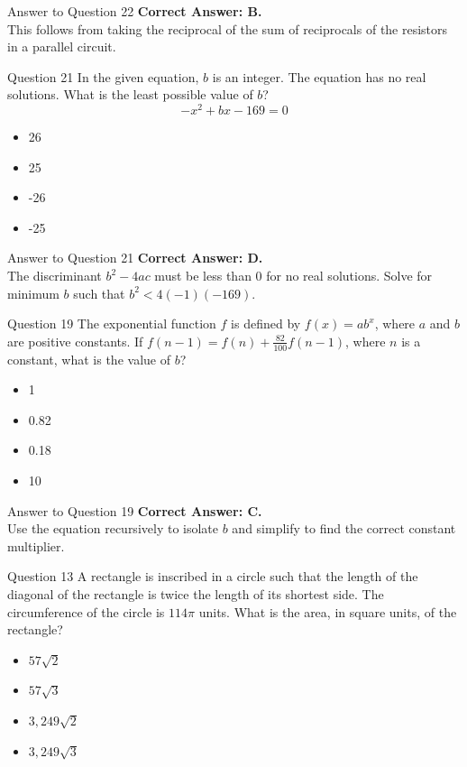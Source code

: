 \documentclass{beamer}
\begin{document}
\begin{frame}{Answer to Question 22}
\textbf{Correct Answer: B.} \\
This follows from taking the reciprocal of the sum of reciprocals of the resistors in a parallel circuit.
\end{frame}

\begin{frame}{Question 21}
In the given equation, $b$ is an integer. The equation has no real solutions.  
What is the least possible value of $b$?
\[
-x^2 + bx - 169 = 0
\]
\begin{itemize}
    \item[A.] 26
    \item[B.] 25
    \item[C.] -26
    \item[D.] -25
\end{itemize}
\end{frame}

\begin{frame}{Answer to Question 21}
\textbf{Correct Answer: D.} \\
The discriminant $b^2 - 4ac$ must be less than 0 for no real solutions. Solve for minimum $b$ such that $b^2 < 4(-1)(-169)$.
\end{frame}

\begin{frame}{Question 19}
The exponential function $f$ is defined by $f(x) = ab^x$, where $a$ and $b$ are positive constants.  
If $f(n - 1) = f(n) + \frac{82}{100}f(n - 1)$, where $n$ is a constant, what is the value of $b$?
\begin{itemize}
    \item[A.] 1
    \item[B.] 0.82
    \item[C.] 0.18
    \item[D.] 10
\end{itemize}
\end{frame}

\begin{frame}{Answer to Question 19}
\textbf{Correct Answer: C.} \\
Use the equation recursively to isolate $b$ and simplify to find the correct constant multiplier.
\end{frame}

\begin{frame}{Question 13}
A rectangle is inscribed in a circle such that the length of the diagonal of the rectangle is twice the length of its shortest side.  
The circumference of the circle is $114\pi$ units.  
What is the area, in square units, of the rectangle?
\begin{itemize}
    \item[A.] $57\sqrt{2}$
    \item[B.] $57\sqrt{3}$
    \item[C.] $3,\!249\sqrt{2}$
    \item[D.] $3,\!249\sqrt{3}$
\end{itemize}
\end{frame}
\end{document}
